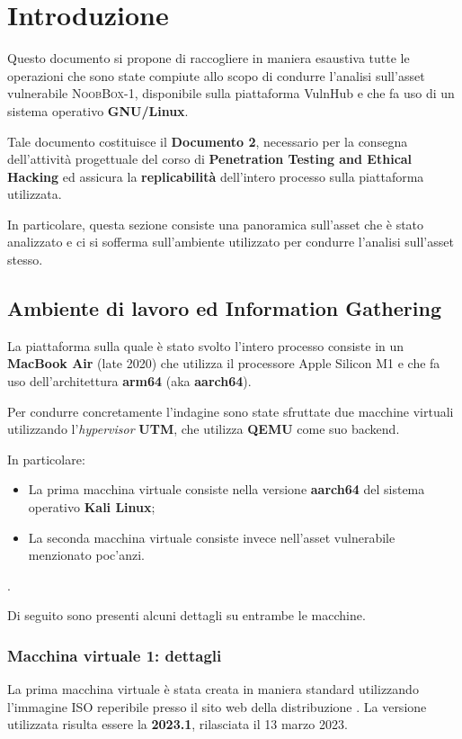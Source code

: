 \documentclass[a4paper, 12pt, oneside]{article}
\begin{document}
\section{Introduzione}
Questo documento si propone di raccogliere in maniera esaustiva tutte le operazioni che sono state compiute allo scopo di condurre l'analisi sull'asset vulnerabile \textsc{NoobBox-1}, disponibile sulla piattaforma VulnHub \cite{noobbox} e che fa uso di un sistema operativo \textbf{GNU\slash Linux}.

Tale documento costituisce il \textbf{Documento 2}, necessario per la consegna dell'attività progettuale del corso di \textbf{Penetration Testing and Ethical Hacking} ed assicura la \textbf{replicabilità} dell'intero processo sulla piattaforma utilizzata.

In particolare, questa sezione consiste una panoramica sull'asset che è stato analizzato e ci si sofferma sull'ambiente utilizzato per condurre l'analisi sull'asset stesso.

\subsection{Ambiente di lavoro ed Information Gathering}
La piattaforma sulla quale è stato svolto l'intero processo consiste in un \textbf{MacBook Air} (late 2020) che utilizza il processore Apple Silicon M1 e che fa uso dell'architettura \textbf{arm64} (aka \textbf{aarch64}).

Per condurre concretamente l'indagine sono state sfruttate due macchine virtuali utilizzando l'\textit{hypervisor} \textbf{UTM}, che utilizza \textbf{QEMU} come suo backend.

In particolare:

\begin{itemize}
    \item La prima macchina virtuale consiste nella versione \textbf{aarch64} del sistema operativo \textbf{Kali Linux};
    \item La seconda macchina virtuale consiste invece nell'asset vulnerabile menzionato poc'anzi.
\end{itemize}.

Di seguito sono presenti alcuni dettagli su entrambe le macchine.

\subsubsection{Macchina virtuale 1: dettagli}
La prima macchina virtuale è stata creata in maniera standard utilizzando l'immagine ISO reperibile presso il sito web della distribuzione \cite{kali}. La versione utilizzata risulta essere la \textbf{2023.1}, rilasciata il 13 marzo 2023. 
\end{document}
